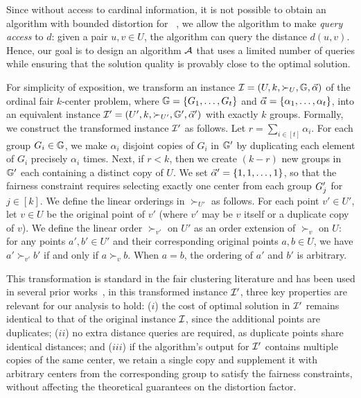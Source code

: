 \documentclass{article}
\begin{document}
Since without access to cardinal information, it is not possible to obtain an algorithm with bounded distortion for \ordkcen~\cite{burkhardt2024low}, we allow the algorithm to make \emph{query access} to $d$: given a pair $u,v\in U$, the algorithm can query the distance $d(u,v)$. 
Hence, our goal is to design an algorithm $\mathcal{A}$ that uses a limited number of queries while ensuring that the solution quality is provably close to the optimal solution. 


For simplicity of exposition, we transform an instance $\mathcal{I} = (U, k, \succ_U, \mathbb{G}, \vec{\alpha})$ of the ordinal fair $k$-center problem, where $\mathbb{G} = \{G_1, \dots, G_t\}$ and $\vec{\alpha} = \{\alpha_1, \dots, \alpha_t\}$, into an equivalent instance $\mathcal{I}' = (U', k, \succ_{U'}, \mathbb{G}', \vec{\alpha}')$ with exactly $k$ groups.
Formally, we construct the transformed instance $\mathcal{I}'$ as follows. 
Let $r = \sum_{i \in [t]} \alpha_i$. 
For each group $G_i \in \mathbb{G}$, we make $\alpha_i$ disjoint copies of $G_i$ in $\mathbb{G}'$ by duplicating each element of $G_i$ precisely $\alpha_i$ times. Next, if $r < k$, then we create $(k-r)$ new groups in $\mathbb{G}'$ each containing a distinct copy of $U$. We set $\vec{\alpha}' = \{1, 1, \dots, 1\}$, so that the fairness constraint requires selecting exactly one center from each group $G'_j$ for $j \in [k]$. 
We define the linear orderings in $\succ_{U'}$ as follows. 
For each point $v' \in U'$, let $v \in U$ be the original point of $v'$ (where $v'$ may be $v$ itself or a duplicate copy of $v$). 
We define the linear order $\succ_{v'}$ on $U'$ as an order extension of $\succ_{v}$ on $U$: for any points $a', b' \in U'$ and their corresponding original points $a, b \in U$, we have $a' \succ_{v'} b'$ if and only if $a \succ_{v} b$.
When $a = b$, the ordering of $a'$ and $b'$ is arbitrary.







This transformation is standard in the fair clustering literature and has been used in several prior works~\cite{thejaswi2022clustering, thejaswi2024diversity, gadekar2025fair}, in this transformed instance $\mathcal{I}'$, three key properties are relevant for our analysis to hold: ($i$) the cost of optimal solution in $\mathcal{I}'$ remains identical to that of the original instance $\mathcal{I}$, since the additional points are duplicates; {($ii$) no extra distance queries are required, as duplicate points share identical distances;} and ($iii$) if the algorithm's output for $\mathcal{I}'$ contains multiple copies of the same center, we retain a single copy and supplement it with arbitrary 
centers
from the corresponding group to satisfy the fairness constraints, without affecting the theoretical guarantees on the distortion factor.
\end{document}
